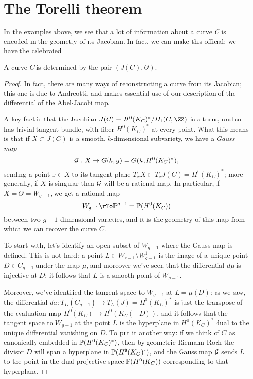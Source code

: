 \section{The Torelli theorem}
In the examples above, we see that a lot of information about a curve $C$ is encoded in the geometry of its Jacobian. In fact, we can make this official: we have the celebrated

\begin{theorem}[Torelli]
A curve $C$ is determined by the pair $(J(C), \Theta)$.
\end{theorem}

\begin{proof}
In fact, there are many ways of reconstructing a curve from its Jacobian; this one is  due to Andreotti, and makes essential use of our description of the differential of the Abel-Jacobi map. 

A key  fact is that the Jacobian $J(C) = H^0(K_C)^*/H_1(C,\ZZ)$ is a torus, and so has trivial tangent bundle, with fiber $H^0(K_C)^*$ at every point. What this means is that if $X \subset J(C)$ is a smooth, $k$-dimensional subvariety, we have a \emph{Gauss map}
$$
\cG : X \to G(k, g) = G(k, H^0(K_C)^*),
$$
sending a point $x \in X$ to its tangent plane $T_xX \subset T_xJ(C) = H^0(K_C)^*$; more generally, if $X$ is singular then $\cG$ will be a rational map. In particular, if $X = \Theta = W_{g-1}$, we get a rational map
$$
W_{g-1} \rTo \PP^{g-1} = \PP(H^0(K_C))
$$
between two $g-1$-dimensional varieties, and it is the geometry of this map from which we can recover the curve $C$.

To start with, let's identify an open subset of $W_{g-1}$ where the Gauss map is defined. This is not hard: a point $L \in W_{g-1} \setminus W^1_{g-1}$ is the image of a unique point $D \in C_{g-1}$ under the map $\mu$, and moreover we've seen that the differential $d\mu$ is injective at $D$; it follows that $L$ is a smooth point of $W_{g-1}$. 

Moreover, we've identified the tangent space to $W_{g-1}$ at $L = \mu(D)$: as we saw, the differential $d\mu : T_D(C_{g-1}) \to T_L(J) = H^0(K_C)^*$ is just the transpose of the evaluation map $H^0(K_C) \to H^0(K_C(-D))$, and it follows that the tangent space to $W_{g-1}$ at the point $L$ is the hyperplane in $H^0(K_C)^*$ dual to the unique differential vanishing on $D$. To put it another way: if we think of $C$ as canonically embedded in $\PP(H^0(K_C)^*)$, then by geometric Riemann-Roch the divisor $D$ will span a hyperplane in $\PP(H^0(K_C)^*)$, and the Gauss map $\cG$ sends $L$ to the point in the dual projective space $\PP(H^0(K_C))$ corresponding to that hyperplane.


\end{proof}
